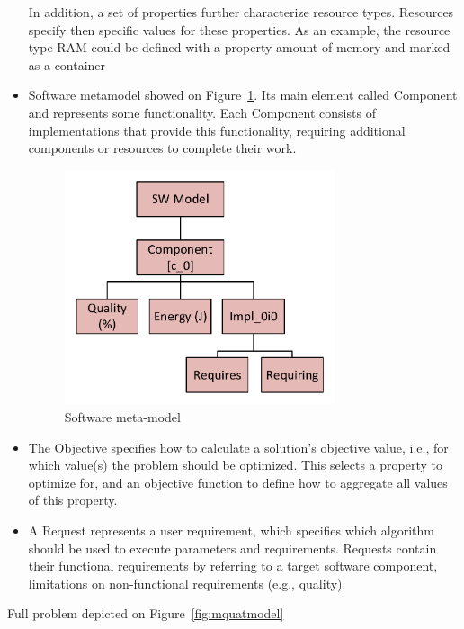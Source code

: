 \begin{itemize}
	In addition, a set of properties further characterize resource types. Resources specify then specific values for these properties. As an example, the resource type RAM could be defined with a property amount of memory and marked as a container
	\item Software metamodel showed on Figure~\ref{fig:SWModel}. Its main element called Component and represents some functionality.
	Each Component consists of implementations that provide this functionality, requiring additional components or resources to complete their work. 
	\begin{figure}
		\centering
		\includegraphics[width=0.75\textwidth]{images/SWModel}
		\caption[Software meta-model]{Software meta-model}
		\label{fig:SWModel}
	\end{figure}
	\item The Objective specifies how to calculate a solution's objective value, i.e., for which value(s) the problem should be optimized. This selects a property to optimize for, and an objective function to define how to aggregate all values of this property.
	\item A Request represents a user requirement, which specifies which algorithm should be used to execute parameters and requirements. Requests contain their functional requirements by referring to a target software component, limitations on non-functional requirements (e.g., quality).
\end{itemize}
Full problem depicted on Figure~\ref{fig:mquatmodel}
